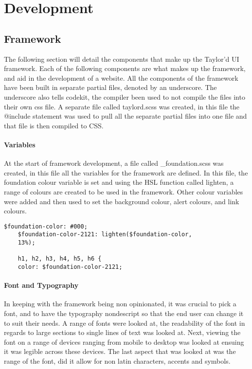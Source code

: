 \newpage
\part{Development}
\chapter*{Framework}
The following section will detail the components that make up the Taylor'd UI framework. Each of the following components are what makes up the framework, and aid in the development of a website. All the components of the framework have been built in separate partial files, denoted by an underscore. The underscore also tells codekit, the compiler been used to not compile the files into their own css file. A separate file called taylord.scss was created, in this file the @include statement was used to pull all the separate partial files into one file and that file is then compiled to CSS. 

\subsection{Variables}
At the start of framework development, a file called \_foundation.scss was created, in this file all the variables for the framework are defined. In this file, the foundation colour variable is set and using the HSL function called lighten, a range of colours are created to be used in the framework. Other colour variables were added and then used to set the background colour, alert colours, and link colours.

\begin{lstlisting}[language=CSS3]
	$foundation-color: #000;
	$foundation-color-2121: lighten($foundation-color, 
	13%);

	h1, h2, h3, h4, h5, h6 {
  	color: $foundation-color-2121;
\end{lstlisting}

\subsection{Font and Typography}
In keeping with the framework being non opinionated, it was crucial to pick a font, and to have the typography nondescript so that the end user can change it to suit their needs. A range of fonts were looked at, the readability of the font in regards to large sections to single lines of text was looked at. Next, viewing the font on a range of devices ranging from mobile to desktop was looked at ensuing it was legible across these devices. The last aspect that was looked at was the range of the font, did it allow for non latin characters, accents and symbols. 

